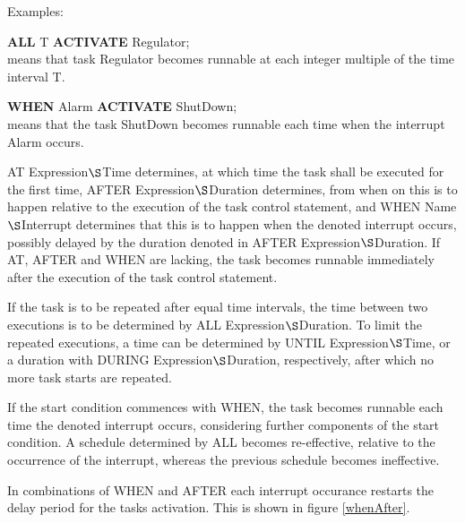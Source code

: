 
Examples:

{\bf ALL} T {\bf ACTIVATE} Regulator;\\
\x means that task Regulator becomes runnable at each integer
multiple of the time interval T.

{\bf WHEN} Alarm {\bf ACTIVATE} ShutDown;\\
\x means that the task ShutDown becomes runnable each time when the
interrupt Alarm occurs.

AT Expression$\S $Time determines, at which time the task shall be
executed for the first time, AFTER Expression$\S $Duration determines,
from when on this is to happen relative to the execution of the task
control statement, and WHEN Name$\S $Interrupt determines that this is
to happen when the denoted interrupt occurs, possibly delayed by the
duration denoted in AFTER Expression$\S $Duration. If AT, AFTER and WHEN
are lacking, the task becomes runnable immediately after the execution
of the task control statement.

If the task is to be repeated after equal time intervals, the time between
two executions is to be determined by ALL Expression$\S $Duration. To
limit the repeated executions, a time can be determined by UNTIL
Expression$\S $Time, or a duration with DURING Expression$\S $Duration,
respectively, after which no more task starts are repeated.

If the start condition commences with WHEN, the task becomes runnable
each time the denoted interrupt occurs, considering further components
of the start condition. A schedule determined by ALL becomes
re-effective, relative to the occurrence of the interrupt, whereas the
previous schedule becomes ineffective.

\begin{added}
In combinations of WHEN and AFTER each interrupt occurance restarts
the delay period for the tasks activation.
This is shown in figure  \ref{whenAfter}.
\end{added}

